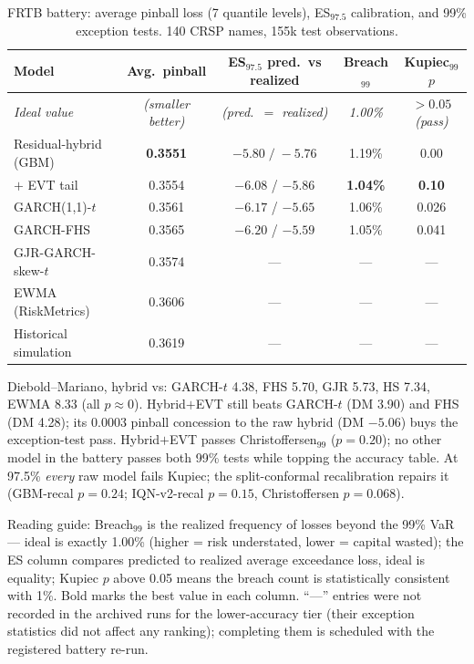 \documentclass[11pt]{article}
\theoremstyle{remark}
\begin{document}
\begin{table}[t]
\centering
\begin{threeparttable}
\caption{FRTB battery: average pinball loss (7 quantile levels),
ES$_{97.5}$ calibration, and 99\% exception tests. 140 CRSP names, 155k
test observations.}
\label{tab:frtb}
\begin{tabular}{lcccc}
\toprule
Model & Avg.\ pinball & ES$_{97.5}$ pred.\ vs realized & Breach$_{99}$ & Kupiec$_{99}$ $p$ \\
\midrule
\emph{Ideal value} & \emph{(smaller better)} & \emph{(pred.\ $=$ realized)} & \emph{1.00\%} & \emph{$>0.05$ (pass)} \\
\midrule
Residual-hybrid (GBM) & \textbf{0.3551} & $\mathbf{-5.80\;/\;-5.76}$ & 1.19\% & 0.00 \\
\quad $+$ EVT tail & 0.3554 & $-6.08$ / $-5.86$ & \textbf{1.04\%} & \textbf{0.10} \\
GARCH(1,1)-$t$ & 0.3561 & $-6.17$ / $-5.65$ & 1.06\% & 0.026 \\
GARCH-FHS & 0.3565 & $-6.20$ / $-5.59$ & 1.05\% & 0.041 \\
GJR-GARCH-skew-$t$ & 0.3574 & --- & --- & --- \\
EWMA (RiskMetrics) & 0.3606 & --- & --- & --- \\
Historical simulation & 0.3619 & --- & --- & --- \\
\bottomrule
\end{tabular}
\begin{tablenotes}\footnotesize
\item Diebold--Mariano, hybrid vs: GARCH-$t$ 4.38, FHS 5.70, GJR 5.73,
HS 7.34, EWMA 8.33 (all $p \approx 0$). Hybrid$+$EVT still beats
GARCH-$t$ (DM 3.90) and FHS (DM 4.28); its 0.0003 pinball concession to
the raw hybrid (DM $-5.06$) buys the exception-test pass.
Hybrid$+$EVT passes Christoffersen$_{99}$ ($p=0.20$); no other model in
the battery passes both 99\% tests while topping the accuracy table. At
97.5\% \emph{every} raw model fails Kupiec; the split-conformal
recalibration repairs it (GBM-recal $p=0.24$; IQN-v2-recal $p=0.15$,
Christoffersen $p=0.068$).
\item Reading guide: Breach$_{99}$ is the realized frequency of losses
beyond the 99\% VaR --- ideal is exactly 1.00\% (higher = risk
understated, lower = capital wasted); the ES column compares predicted
to realized average exceedance loss, ideal is equality; Kupiec $p$
above 0.05 means the breach count is statistically consistent with
1\%. Bold marks the best value in each column. ``---'' entries were
not recorded in the archived runs for the lower-accuracy tier (their
exception statistics did not affect any ranking); completing them is
scheduled with the registered battery re-run.
\end{tablenotes}
\end{threeparttable}
\end{table}
\end{document}

